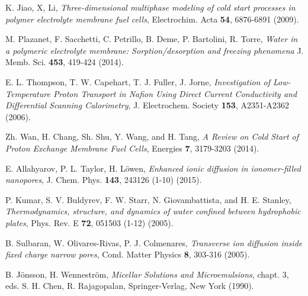 \documentclass[3p,english,preprint]{elsarticle}
\begin{document}
\begin{thebibliography}{00}
K. Jiao, X, Li, 
{\it Three-dimensional multiphase modeling of cold start processes in polymer
electrolyte membrane fuel cells}, 
 Electrochim. Acta {\bf 54}, 6876-6891 (2009).



M. Plazanet, F. Sacchetti, C. Petrillo, B. Deme, P. Bartolini, R. Torre,
{\it Water in a polymeric electrolyte membrane: Sorption/desorption and freezing phenomena}
J.  Memb. Sci. {\bf 453},  419-424  (2014).


E. L. Thompson, T. W. Capehart, T. J. Fuller,  J. Jorne, 
{\it Investigation of Low-Temperature Proton Transport in Nafion Using
Direct Current Conductivity and Differential Scanning Calorimetry},
  J. Electrochem. Society {\bf 153},  A2351-A2362 (2006). 



Zh. Wan, H. Chang, Sh. Shu, Y. Wang, and H. Tang,
{\it A Review on Cold Start of Proton Exchange Membrane Fuel Cells},
Energies {\bf 7}, 3179-3203  (2014). %










E. Allahyarov, P. L. Taylor, H. L\"owen, 
{\it Enhanced ionic diffusion in ionomer-filled nanopores},
J. Chem. Phys. {\bf 143}, 243126 (1-10) (2015).


 P. Kumar, S. V. Buldyrev, F. W. Starr, N. Giovambattista,  and H. E. Stanley, 
{\it  Thermodynamics, structure, and dynamics of water confined 
between hydrophobic plates},
Phys. Rev. E {\bf 72}, 051503 (1-12) (2005). 




B. Sulbaran, W. Olivares-Rivas, P. J. Colmenares, 
{\it Transverse ion diffusion inside fixed charge narrow pores}, 
  Cond. Matter Physics {\bf 8}, 303-316 (2005).


B. J\"onsson, H. Wennestr\"om, 
{\it  Micellar Solutions and Microemulsions}, chapt. 3, eds.
S. H. Chen, R. Rajagopalan,  Springer-Verlag, New York (1990).




\end{thebibliography}
\end{document}
